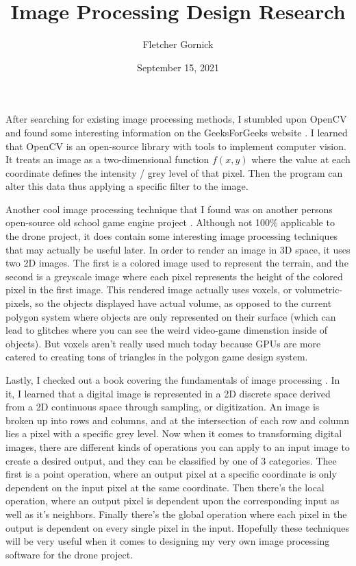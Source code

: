 \documentclass[11pt]{article}
\title{Image Processing Design Research}
\author{Fletcher Gornick}
\date{September 15, 2021}
\begin{document}
\maketitle

After searching for existing image processing methods, I stumbled upon OpenCV and found 
some interesting information on the GeeksForGeeks website \cite{geek}.
I learned that OpenCV is an open-source library with tools to implement computer vision.
It treats an image as a two-dimensional function $f(x,y)$ where the value at each coordinate
defines the intensity / grey level of that pixel.  Then the program can alter this data thus
applying a specific filter to the image.

Another cool image processing technique that I found was on another persons open-source old
school game engine project \cite{werem}.  Although not 100\% applicable to the drone project,
it does contain some interesting image processing techniques that may actually be useful later.
In order to render an image in 3D space, it uses two 2D images.  The first is a colored image
used to represent the terrain, and the second is a greyscale image where each pixel represents
the height of the colored pixel in the first image.  This rendered image actually uses voxels,
or volumetric-pixels, so the objects displayed have actual volume, as opposed to the current
polygon system where objects are only represented on their surface (which can lead to glitches
where you can see the weird video-game dimenstion inside of objects).  But voxels aren't really
used much today because GPUs are more catered to creating tons of triangles in the polygon game
design system.

Lastly, I checked out a book covering the fundamentals of image processing \cite{young}.  In it,
I learned that a digital image is represented in a 2D discrete space derived from a 2D continuous
space through sampling, or digitization.  An image is broken up into rows and columns, and at the
intersection of each row and column lies a pixel with a specific grey level.  Now when it comes to 
transforming digital images, there are different kinds of operations you can apply to an input 
image to create a desired output, and they can be classified by one of 3 categories.  Thee first 
is a point operation, where an output pixel at a specific coordinate is only dependent on the input 
pixel at the same coordinate.  Then there's the local operation, where an output pixel is dependent 
upon the corresponding input as well as it's neighbors.  Finally there's the global operation where 
each pixel in the output is dependent on every single pixel in the input.  Hopefully these 
techniques will be very useful when it comes to designing my very own image processing software for 
the drone project.



\end{document}
